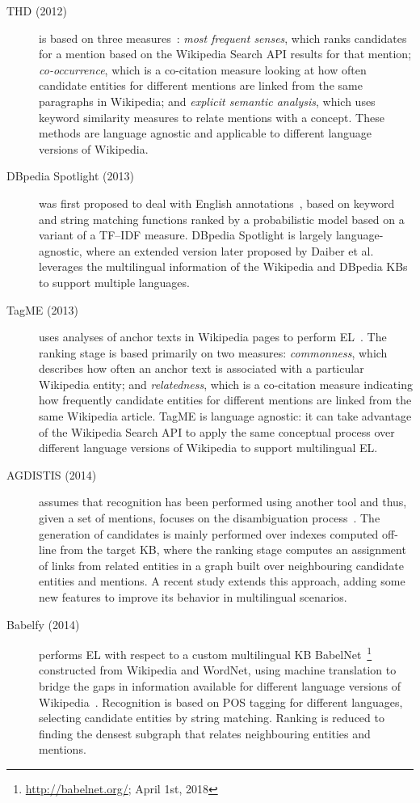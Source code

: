 \documentclass{llncs}
\begin{document}
\begin{description}
\item[THD (2012)] is based on three measures~\cite{THD-dojchinovski2012recognizing}: \textit{most frequent senses}, which ranks candidates for a mention based on the Wikipedia Search API results for that mention; \textit{co-occurrence}, which is a co-citation measure looking at how often candidate entities for different mentions are linked from the same paragraphs in Wikipedia; and \textit{explicit semantic analysis}, which uses keyword similarity measures to relate mentions with a concept. These methods are language agnostic and applicable to different language versions of Wikipedia.
\item[DBpedia Spotlight (2013)] was first proposed to deal with English annotations~\cite{mendes2011dbpedia}, based on keyword and string matching functions ranked by a probabilistic model based on a variant of a TF--IDF measure. DBpedia Spotlight is largely language-agnostic, where an extended version later proposed by Daiber et al.~\cite{daiber2013improving} leverages the multilingual information of the Wikipedia and DBpedia KBs to support multiple languages.
\item[TagME (2013)] uses analyses of anchor texts in Wikipedia pages to perform EL~\cite{ferragina2010tagme}. The ranking stage is based primarily on two measures: \textit{commonness}, which describes how often an anchor text is associated with a particular Wikipedia entity; and \textit{relatedness}, which is a co-citation measure indicating how frequently candidate entities for different mentions are linked from the same Wikipedia article. TagME is language agnostic: it can take advantage of the Wikipedia Search API to apply the same conceptual process over different language versions of Wikipedia to support multilingual EL.
\item[AGDISTIS (2014)] assumes that recognition has been performed using another tool and thus, given a set of mentions, focuses on the disambiguation process~\cite{usbeck2014agdistis}. The generation of candidates is mainly performed over indexes computed off-line from the target KB, where the ranking stage computes an assignment of links from related entities in a graph built over neighbouring candidate entities and mentions. A recent study \cite{mag2017} extends this approach, adding some new features to improve its behavior in multilingual scenarios. 
\item[Babelfy (2014)] performs EL with respect to a custom multilingual KB BabelNet~\footnote{\url{http://babelnet.org/}; April 1st, 2018} constructed from Wikipedia and WordNet, using machine translation to bridge the gaps in information available for different language versions of Wikipedia~\cite{Babelfy-moro2014entity}. Recognition is based on POS tagging for different languages, selecting candidate entities by string matching. Ranking is reduced to finding the densest subgraph that relates neighbouring entities and mentions.

\end{description}
\end{document}
